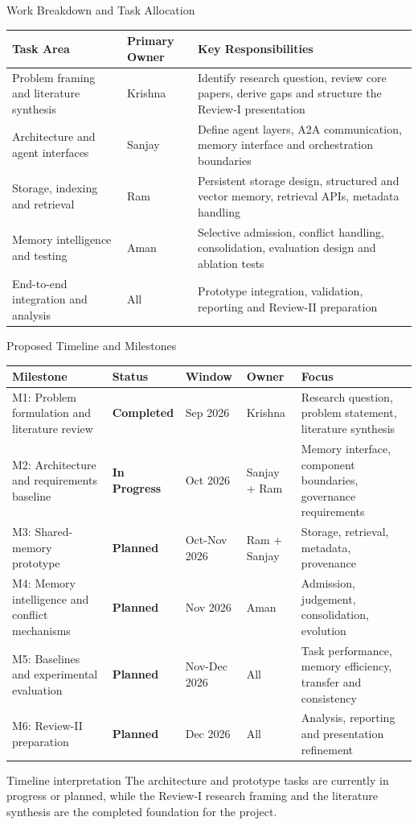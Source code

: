 \begin{frame}{Work Breakdown and Task Allocation}
\scriptsize
\begin{tabularx}{\textwidth}{p{}p{}X}
\toprule
\textbf{Task Area} & \textbf{Primary Owner} & \textbf{Key Responsibilities} \\
\midrule
Problem framing and literature synthesis & Krishna & Identify research question, review core papers, derive gaps and structure the Review-I presentation \\
Architecture and agent interfaces & Sanjay & Define agent layers, A2A communication, memory interface and orchestration boundaries \\
Storage, indexing and retrieval & Ram & Persistent storage design, structured and vector memory, retrieval APIs, metadata handling \\
Memory intelligence and testing & Aman & Selective admission, conflict handling, consolidation, evaluation design and ablation tests \\
End-to-end integration and analysis & All & Prototype integration, validation, reporting and Review-II preparation \\
\bottomrule
\end{tabularx}
\end{frame}

\begin{frame}{Proposed Timeline and Milestones}
\scriptsize
\begin{tabularx}{\textwidth}{p{}p{}p{}p{}p{}}
\toprule
\textbf{Milestone} & \textbf{Status} & \textbf{Window} & \textbf{Owner} & \textbf{Focus} \\
\midrule
M1: Problem formulation and literature review & \textbf{Completed} & Sep 2026 & Krishna & Research question, problem statement, literature synthesis \\
M2: Architecture and requirements baseline & \textbf{In Progress} & Oct 2026 & Sanjay + Ram & Memory interface, component boundaries, governance requirements \\
M3: Shared-memory prototype & \textbf{Planned} & Oct-Nov 2026 & Ram + Sanjay & Storage, retrieval, metadata, provenance \\
M4: Memory intelligence and conflict mechanisms & \textbf{Planned} & Nov 2026 & Aman & Admission, judgement, consolidation, evolution \\
M5: Baselines and experimental evaluation & \textbf{Planned} & Nov-Dec 2026 & All & Task performance, memory efficiency, transfer and consistency \\
M6: Review-II preparation & \textbf{Planned} & Dec 2026 & All & Analysis, reporting and presentation refinement \\
\bottomrule
\end{tabularx}
\vspace{3mm}
\begin{block}{Timeline interpretation}
The architecture and prototype tasks are currently in progress or planned, while the Review-I research framing and the literature synthesis are the completed foundation for the project.
\end{block}
\end{frame}
